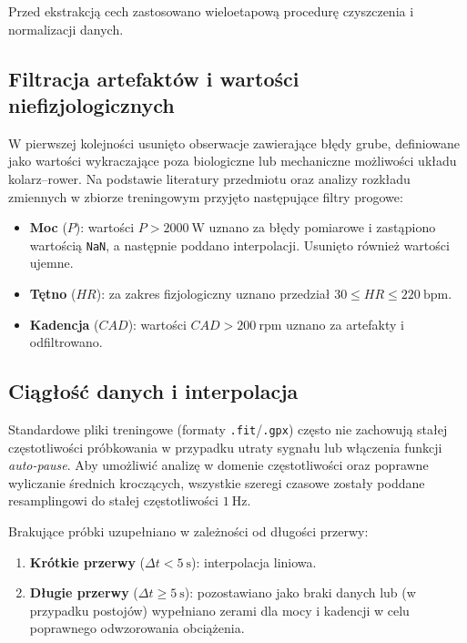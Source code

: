 Przed ekstrakcją cech zastosowano wieloetapową procedurę czyszczenia i normalizacji danych.

\subsection{Filtracja artefaktów i wartości niefizjologicznych}

W pierwszej kolejności usunięto obserwacje zawierające błędy grube, definiowane jako wartości wykraczające poza biologiczne lub mechaniczne możliwości układu kolarz--rower.
Na podstawie literatury przedmiotu oraz analizy rozkładu zmiennych w zbiorze treningowym przyjęto następujące filtry progowe:
\begin{itemize}
  \item \textbf{Moc} ($P$): wartości $P > 2000\ \mathrm{W}$ uznano za błędy pomiarowe i zastąpiono wartością \texttt{NaN}, a następnie poddano interpolacji. Usunięto również wartości ujemne.
  \item \textbf{Tętno} ($HR$): za zakres fizjologiczny uznano przedział $30 \le HR \le 220\ \mathrm{bpm}$.
  \item \textbf{Kadencja} ($CAD$): wartości $CAD > 200\ \mathrm{rpm}$ uznano za artefakty i odfiltrowano.
\end{itemize}

\subsection{Ciągłość danych i interpolacja}

Standardowe pliki treningowe (formaty \texttt{.fit}/\texttt{.gpx}) często nie zachowują stałej częstotliwości próbkowania w przypadku utraty sygnału lub włączenia funkcji \textit{auto-pause}.
Aby umożliwić analizę w domenie częstotliwości oraz poprawne wyliczanie średnich kroczących, wszystkie szeregi czasowe zostały poddane resamplingowi do stałej częstotliwości $1\ \mathrm{Hz}$.

Brakujące próbki uzupełniano w zależności od długości przerwy:
\begin{enumerate}
  \item \textbf{Krótkie przerwy} ($\Delta t < 5\ \mathrm{s}$): interpolacja liniowa.
  \item \textbf{Długie przerwy} ($\Delta t \ge 5\ \mathrm{s}$): pozostawiano jako braki danych lub (w przypadku postojów) wypełniano zerami dla mocy i kadencji w celu poprawnego odwzorowania obciążenia.
\end{enumerate}

